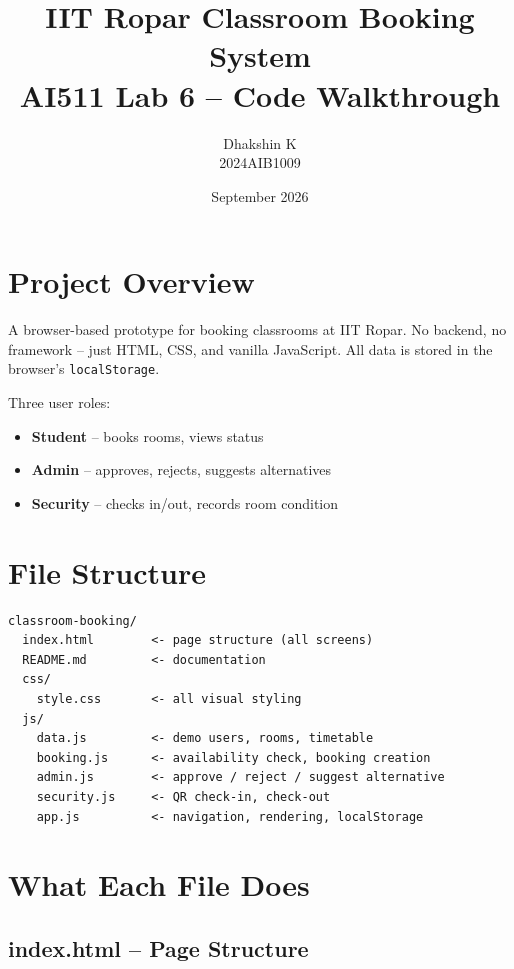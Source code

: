\documentclass[12pt,a4paper]{article}
\title{\textbf{IIT Ropar Classroom Booking System} \\ \large AI511 Lab 6 -- Code Walkthrough}
\author{Dhakshin K \\ 2024AIB1009}
\date{September 2026}
\begin{document}
\maketitle
\tableofcontents
\newpage

\section{Project Overview}

A browser-based prototype for booking classrooms at IIT Ropar. No backend, no framework -- just HTML, CSS, and vanilla JavaScript. All data is stored in the browser's \texttt{localStorage}.

Three user roles:
\begin{itemize}
  \item \textbf{Student} -- books rooms, views status
  \item \textbf{Admin} -- approves, rejects, suggests alternatives
  \item \textbf{Security} -- checks in/out, records room condition
\end{itemize}

\section{File Structure}

\begin{lstlisting}
classroom-booking/
  index.html        <- page structure (all screens)
  README.md         <- documentation
  css/
    style.css       <- all visual styling
  js/
    data.js         <- demo users, rooms, timetable
    booking.js      <- availability check, booking creation
    admin.js        <- approve / reject / suggest alternative
    security.js     <- QR check-in, check-out
    app.js          <- navigation, rendering, localStorage
\end{lstlisting}

\section{What Each File Does}

\subsection{index.html -- Page Structure}
\end{document}
